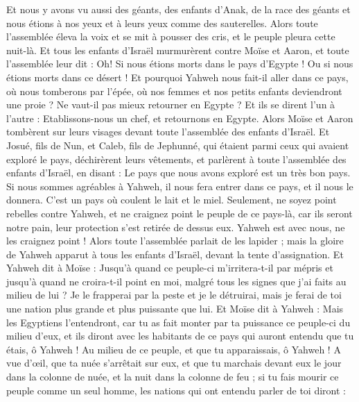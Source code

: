 \begin{multicols}{2}
Et nous y avons vu aussi des géants, des enfants d'Anak, de la race des géants et nous étions à nos yeux et à leurs yeux comme des sauterelles.
\VerseOne{}Alors toute l'assemblée éleva la voix et se mit à pousser des cris, et le peuple pleura cette nuit-là.
Et tous les enfants d'Israël murmurèrent contre Moïse et Aaron, et toute l'assemblée leur dit : Oh! Si nous étions morts dans le pays d’Egypte ! Ou si nous étions morts dans ce désert !
Et pourquoi Yahweh nous fait-il aller dans ce pays, où nous tomberons par l'épée, où nos femmes et nos petits enfants deviendront une proie ? Ne vaut-il pas mieux retourner en Egypte ?
Et ils se dirent l'un à l'autre : Etablissons-nous un chef, et retournons en Egypte.
Alors Moïse et Aaron tombèrent sur leurs visages devant toute l'assemblée des enfants d'Israël.
Et Josué, fils de Nun, et Caleb, fils de Jephunné, qui étaient parmi ceux qui avaient exploré le pays, déchirèrent leurs vêtements,
et parlèrent à toute l'assemblée des enfants d'Israël, en disant : Le pays que nous avons exploré est un très bon pays.
Si nous sommes agréables à Yahweh, il nous fera entrer dans ce pays, et il nous le donnera. C'est un pays où coulent le lait et le miel.
Seulement, ne soyez point rebelles contre Yahweh, et ne craignez point le peuple de ce pays-là, car ils seront notre pain, leur protection s’est retirée de dessus eux. Yahweh est avec nous, ne les craignez point !
Alors toute l'assemblée parlait de les lapider ; mais la gloire de Yahweh apparut à tous les enfants d'Israël, devant la tente d'assignation.
Et Yahweh dit à Moïse : Jusqu'à quand ce peuple-ci m’irritera-t-il par mépris et jusqu'à quand ne croira-t-il point en moi, malgré tous les signes que j'ai faits au milieu de lui ?
Je le frapperai par la peste et je le détruirai, mais je ferai de toi une nation plus grande et plus puissante que lui.
Et Moïse dit à Yahweh : Mais les Egyptiens l'entendront, car tu as fait monter par ta puissance ce peuple-ci du milieu d'eux,
et ils diront avec les habitants de ce pays qui auront entendu que tu étais, ô Yahweh ! Au milieu de ce peuple, et que tu apparaissais, ô Yahweh ! A vue d’œil, que ta nuée s’arrêtait sur eux, et que tu marchais devant eux le jour dans la colonne de nuée, et la nuit dans la colonne de feu ;
si tu fais mourir ce peuple comme un seul homme, les nations qui ont entendu parler de toi diront :

\end{multicols}
